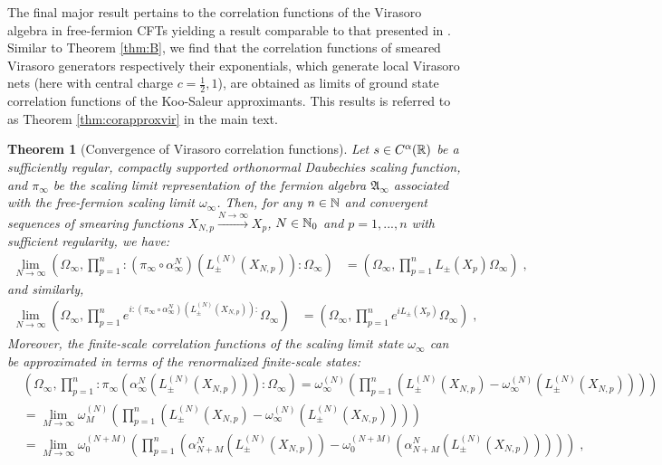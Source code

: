 \documentclass[a4paper, 11pt]{article}
\newcommand{\fA}{\mathfrak{A}}\newcommand{\cA}{\mathcal{A}}\newcommand{\dA}{\mathds{A}}\newcommand{\sA}{\mathscr{A}}
\DeclareMathOperator{\1}{\mathds{1}}
\newtheorem{letterthm}{Theorem}
\begin{document}
The final major result pertains to the correlation functions of the Virasoro algebra in free-fermion CFTs yielding a result comparable to that presented in \cite{ZiniConformalFieldTheories}. Similar to Theorem \ref{thm:B}, we find that the correlation functions of smeared Virasoro generators respectively their exponentials, which generate local Virasoro nets \cite{BrunettiModularStructureAnd, GabbianiOperatorAlgebrasAnd} (here with central charge $c=\tfrac{1}{2},1$), are obtained as limits of ground state correlation functions of the Koo-Saleur approximants. This results is referred to as Theorem \ref{thm:corapproxvir} in the main text.
\begin{letterthm}[Convergence of Virasoro correlation functions]
\label{thm:C}
Let $s\in C^{\alpha}(\mathbb{R})$ be a sufficiently regular, compactly supported orthonormal Daubechies scaling function, and $\pi_{\infty}$ be the scaling limit representation of the fermion algebra $\fA_{\infty}$ associated with the free-fermion scaling limit $\omega_{\infty}$. Then, for any $n\in\mathbb{N}$ and convergent sequences of smearing functions $X_{N,p}\stackrel{N\rightarrow\infty}{\rightarrow} X_{p}$, $N\in\mathbb{N}_{0}$ and $p=1,...,n$ with sufficient regularity, we have:
\begin{align*}
\lim_{N\rightarrow\infty}(\Omega_{\infty},\prod_{p=1}^{n}:\!(\pi_{\infty}\circ\alpha^{N}_{\infty})(L^{(N)}_{\pm}(X_{N,p}))\!:\Omega_{\infty}) & = (\Omega_{\infty},\prod_{p=1}^{n}L_{\pm}(X_{p})\Omega_{\infty})\;,
\end{align*}
and similarly,
\begin{align*}
\lim_{N\rightarrow\infty}(\Omega_{\infty},\prod_{p=1}^{n}e^{i:(\pi_{\infty}\circ\alpha^{N}_{\infty})(L^{(N)}_{\pm}(X_{N,p})):}\Omega_{\infty}) & = (\Omega_{\infty},\prod_{p=1}^{n}e^{iL_{\pm}(X_{p})}\Omega_{\infty})\;,
\end{align*}
Moreover, the finite-scale correlation functions of the scaling limit state $\omega_{\infty}$ can be approximated in terms of the renormalized finite-scale states:
\begin{align*}
& (\Omega_{\infty},\prod_{p=1}^{n}:\!\pi_{\infty}(\alpha^{N}_{\infty}(L^{(N)}_{\pm}(X_{N,p})\!)\!)\!:\Omega_{\infty}) = \omega^{(N)}_{\infty}(\prod_{p=1}^{n}(L^{(N)}_{\pm}(X_{N,p})-\omega^{(N)}_{\infty}(L^{(N)}_{\pm}(X_{N,p})\!)\!)\!) \\
& = \lim_{M\rightarrow\infty}\omega^{(N)}_{M}(\prod_{p=1}^{n}(L^{(N)}_{\pm}(X_{N,p})-\omega^{(N)}_{\infty}(L^{(N)}_{\pm}(X_{N,p})\!)\!)\!) \\
& = \lim_{M\rightarrow\infty}\omega^{(N+M)}_{0}\!(\prod_{p=1}^{n}(\alpha^{N}_{N+M}(L^{(N)}_{\pm}\!(X_{N,p})\!)\!-\!\omega^{(N+M)}_{0}\!(\alpha^{N}_{N+M}(L^{(N)}_{\pm}\!(X_{N,p})\!)\!)\!)\!) \;,

\end{align*}
\end{letterthm}
\end{document}
